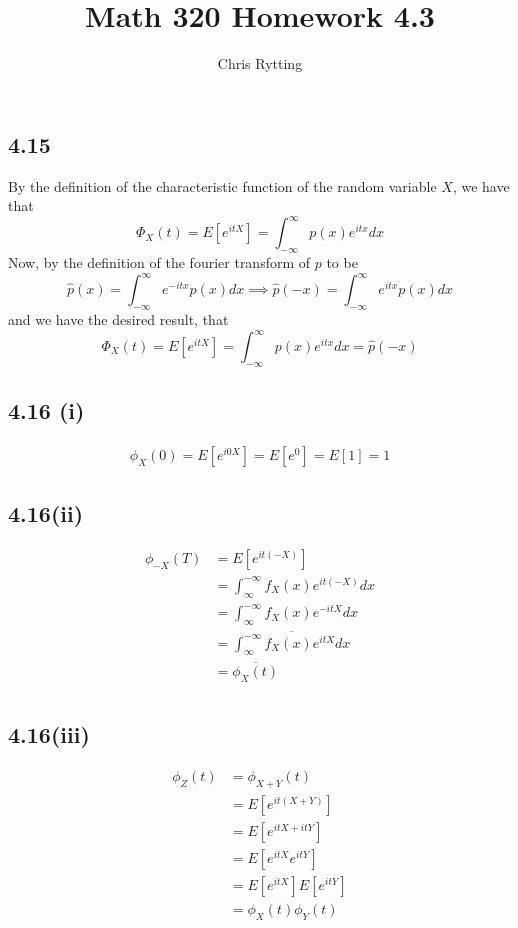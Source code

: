 \documentclass[letterpaper,12pt]{article}
\theoremstyle{definition}
\begin{document}
\title{Math 320 Homework 4.3}
\author{Chris Rytting}
\maketitle

\subsection*{4.15}

By the definition of the characteristic function of the random variable $X$, we have that
\[\Phi_X(t) = E[e^{itX}] = \int^{\infty}_{-\infty} p(x)e^{itx} dx \]
Now, by the definition of the fourier transform of $p$ to be
\[\hat p (x) = \int^{\infty}_{-\infty} e^{-itx} p(x) dx \implies \hat p (-x) = \int^{\infty}_{-\infty} e^{itx} p(x) dx \]
and we have the desired result, that
\[\Phi_X(t) = E[e^{itX}] = \int^{\infty}_{-\infty} p(x)e^{itx} dx = \hat p (-x) \]





\subsection*{4.16 (i)}
\begin{align*}
    \phi_X(0) = E[e^{i0X}] = E[e^{0}] = E[1] = 1 
\end{align*}
\subsection*{4.16(ii)}
\begin{align*}
    \phi_{-X}(T) &= E[e^{it(-X)}] \\
    &= \int^{-\infty}_{\infty} f_X(x)e^{it(-X)} dx\\
    &= \int^{-\infty}_{\infty} f_X(x)e^{-itX} dx\\
    &= \overline{\int^{-\infty}_{\infty} f_X(x)e^{itX} dx}\\
    &= \overline {\phi_X(t)}\\
\end{align*}
\subsection*{4.16(iii)}
\begin{align*}
    \phi_Z(t) &= \phi_{X+Y}(t) \\
    &= E[e^{it(X+Y)}]  \\
    &= E[e^{itX+itY}]  \\
    &= E[e^{itX}e^{itY}]  \\
    &= E[e^{itX}]E[e^{itY}]  \\
    &= \phi_{X}(t) \phi_Y(t) \\
\end{align*}
\end{document}
